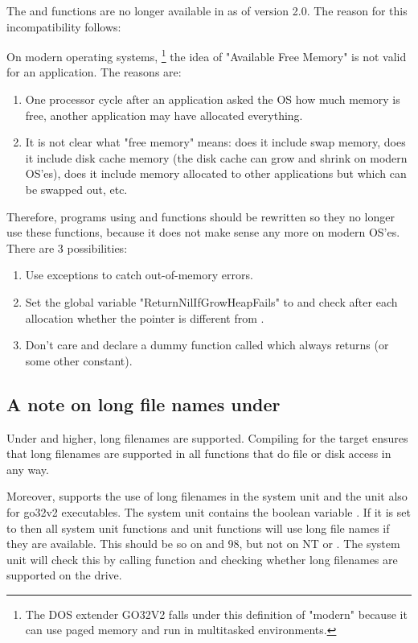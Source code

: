 \begin{remark}
The  and  functions are no longer available in
\fpc as of version 2.0. The reason for this incompatibility follows:

On modern operating systems, \footnote{The DOS extender GO32V2 falls under this
definition of "modern" because it can use paged memory and run in
multitasked environments.} the idea of "Available Free Memory" is not valid for an
application.
The reasons are:
\begin{enumerate}
\item One processor cycle after an application asked the OS how much memory is free,
another application may have allocated everything.
\item It is not clear what "free memory" means: does it include swap memory,
does it include disk cache memory (the disk cache can grow and shrink on
modern OS'es), does it include memory allocated to other applications but
which can be swapped out, etc.
\end{enumerate}

Therefore, programs using  and  functions
should be rewritten so they no longer use these functions, because
it does not make sense any more on modern OS'es. There are 3 possibilities:
\begin{enumerate}
\item Use exceptions to catch out-of-memory errors.
\item Set the global variable "ReturnNilIfGrowHeapFails" to 
and check after each allocation whether the pointer is different from
.
\item Don't care and declare a dummy function called 
which always returns  (or some other constant).
\end{enumerate}

\end{remark}

\subsection{A note on long file names under \dos}
Under  and higher, long filenames are supported. Compiling
for the \windows target ensures that long filenames are supported in all
functions that do file or disk access in any way.

Moreover, \fpc supports the use of long filenames in the system unit and
the  unit also for go32v2 executables. The system unit contains the
boolean variable . If it is set to  then all
system unit functions and  unit functions will use long file names
if they are available. This should be so on  and 98, but
not on \windows NT or . The system unit will check this
by calling \dos function  and checking whether long filenames
are supported on the  drive.

